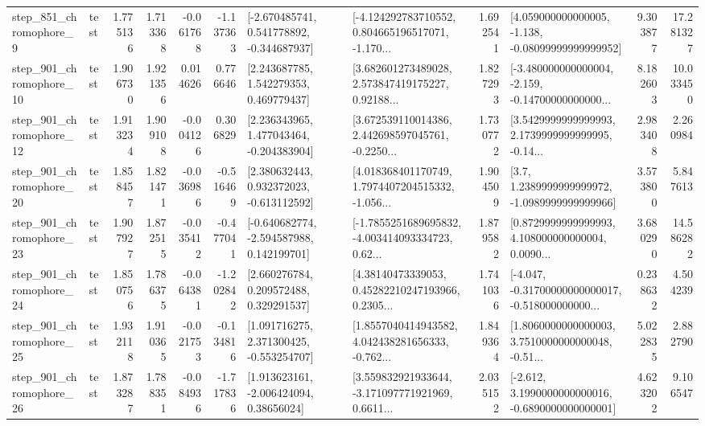 \begin{tabular}{llrrrrllrlrr}
   step\_851\_chromophore\_9 &      test &      1.775136 &    1.713368 &     -0.061768 & -1.137363 &   [-2.670485741, 0.541778892, -0.344687937] &  [-4.124292783710552, 0.804665196517071, -1.170... &       1.692541 &  [4.059000000000005, -1.138, -0.08099999999999952] &            9.303877 &         17.281327 \\
  step\_901\_chromophore\_10 &      test &      1.906730 &    1.921356 &      0.014626 &  0.776646 &     [2.243687785, 1.542279353, 0.469779437] &  [3.682601273489028, 2.573847419175227, 0.92188... &       1.827293 &  [-3.480000000000004, -2.159, -0.14700000000000... &            8.182603 &         10.033450 \\
  step\_901\_chromophore\_12 &      test &      1.913234 &    1.909108 &     -0.004126 &  0.306829 &    [2.236343965, 1.477043464, -0.204383904] &  [3.672539110014386, 2.442698597045761, -0.2250... &       1.730772 &  [3.5429999999999993, 2.1739999999999995, -0.14... &            2.983408 &          2.260984 \\
  step\_901\_chromophore\_20 &      test &      1.858457 &    1.821471 &     -0.036986 & -0.516469 &    [2.380632443, 0.932372023, -0.613112592] &  [4.018368401170749, 1.7974407204515332, -1.056... &       1.904509 &     [3.7, 1.2389999999999972, -1.0989999999999966] &            3.573800 &          5.847613 \\
  step\_901\_chromophore\_23 &      test &      1.907927 &    1.872515 &     -0.035412 & -0.477041 &   [-0.640682774, -2.594587988, 0.142199701] &  [-1.7855251689695832, -4.003414093334723, 0.62... &       1.879582 &  [0.8729999999999993, 4.108000000000004, 0.0090... &            3.680290 &         14.586282 \\
  step\_901\_chromophore\_24 &      test &      1.850756 &    1.786375 &     -0.064381 & -1.202842 &     [2.660276784, 0.209572488, 0.329291537] &  [4.38140473339053, 0.45282210247193966, 0.2305... &       1.741036 &  [-4.047, -0.31700000000000017, -0.518000000000... &            0.238632 &          4.504239 \\
  step\_901\_chromophore\_25 &      test &      1.932118 &    1.910365 &     -0.021753 & -0.134816 &    [1.091716275, 2.371300425, -0.553254707] &  [1.8557040414943582, 4.042438281656333, -0.762... &       1.849364 &  [1.8060000000000003, 3.7510000000000048, -0.51... &            5.022835 &          2.882790 \\
  step\_901\_chromophore\_26 &      test &      1.873287 &    1.788351 &     -0.084936 & -1.717836 &     [1.913623161, -2.006424094, 0.38656024] &  [3.559832921933644, -3.171097771921969, 0.6611... &       2.035152 &  [-2.612, 3.1990000000000016, -0.6890000000000001] &            4.623202 &          9.106547 \\

\end{tabular}
